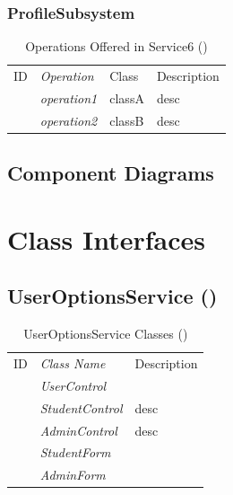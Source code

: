 \documentclass[12pt,letterpaper]{article}
\begin{document}
\subsubsection*{ProfileSubsystem}

\begin{table}[H]
\caption{Operations Offered in Service6 ()} 
\begin{tabu} to 
	\tableheader{}ID & Operation & Class & Description\\
	 & operation1 & classA & desc\\
	 & operation2 & classB & desc\\
\end{tabu}
\end{table}


\subsection{Component Diagrams}

\section{Class Interfaces}

\subsection{UserOptionsService ()}
\begin{table}[H]
	\caption{UserOptionsService Classes ()} 
	\begin{tabu} to 
	    \tableheader{}ID & Class Name & Description \\
	     & UserControl & \\
	     & StudentControl & desc \\
	     & AdminControl & desc \\
	     & StudentForm & \\
	     & AdminForm & \\
	\end{tabu}
\end{table}
\end{document}
